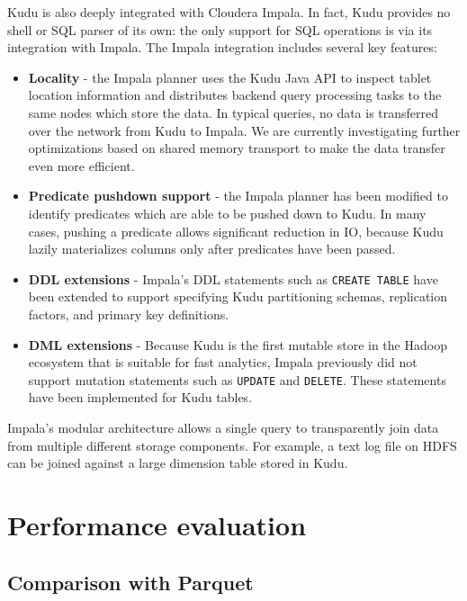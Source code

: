 \documentclass{vldb}
\begin{document}
Kudu is also deeply integrated with Cloudera Impala\cite{impala}. In fact, Kudu provides
no shell or SQL parser of its own: the only support for SQL operations is via its integration
with Impala. The Impala integration includes several key features:
\begin{itemize}
\item {\bf Locality} - the Impala planner uses the Kudu Java API to inspect tablet location
information and distributes backend query processing tasks to the same nodes which store the
data. In typical queries, no data is transferred over the network from Kudu to Impala. We
are currently investigating further optimizations based on shared memory transport to
make the data transfer even more efficient.

\item {\bf Predicate pushdown support} - the Impala planner has been modified to identify
predicates which are able to be pushed down to Kudu. In many cases, pushing a predicate
allows significant reduction in IO, because Kudu lazily materializes columns only after predicates
have been passed.

\item {\bf DDL extensions } - Impala's DDL statements such as {\tt CREATE TABLE} have been
extended to support specifying Kudu partitioning schemas, replication factors, and primary
key definitions.

\item {\bf DML extensions } - Because Kudu is the first mutable store in the Hadoop ecosystem that
is suitable for fast analytics, Impala previously did not support mutation statements such as
{\tt UPDATE} and {\tt DELETE}. These statements have been implemented for Kudu tables.
\end{itemize}

Impala's modular architecture allows a single query to transparently join data from
multiple different storage components. For example, a text log file on HDFS can be joined against
a large dimension table stored in Kudu.

\section{Performance evaluation}
\label{sec:benchmarks}

\subsection{Comparison with Parquet}
\end{document}
